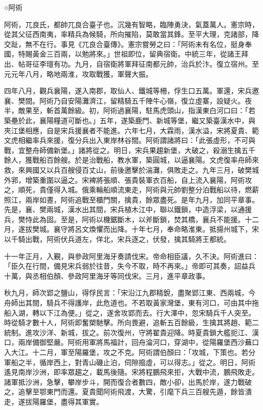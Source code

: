 
\begin{pinyinscope}

 ○阿術



 阿術，兀良氏，都帥兀良合臺子也。沉幾有智略，臨陣勇決，氣蓋萬人。憲宗時，從其父征西南夷，率精兵為候騎，所向摧陷，莫敢當其鋒。至平大理，克諸部，降交趾，無不在行。事見《兀良合臺傳》。憲宗嘗勞之曰：「阿術未有名位，挺身奉國，特賜黃金三百兩，以勉將來。」世祖即位，留典宿衛。中統三年，從諸王拜出、帖哥征李璮有功。九月，自宿衛將軍拜征南都元帥，治兵於汴。復立宿州。至元元年八月，略地兩淮，攻取戰獲，軍聲大振。



 四年八月，觀兵襄陽，遂入南郡，取仙人、鐵城等柵，俘生口五萬。軍還，宋兵邀襄、樊間。阿術乃自安陽灘濟江，留精騎五千陣牛心嶺，復立虛寨，設疑火。夜半，敵果至，斬首萬餘級。初，阿術過襄陽，駐馬虎頭山，指漢東白河口曰：「若築壘於此，襄陽糧道可斷也。」五年，遂築鹿門、新城等堡，繼又築臺漢水中，與夾江堡相應，自是宋兵援襄者不能進。六年七月，大霖雨，漢水溢，宋將夏貴、範文虎相繼率兵來援，復分兵出入東岸林谷間。阿術謂諸將曰：「此張虛形，不可與戰，宜整舟師備新堡。」諸將從之。明日，宋兵果趨新堡，大破之，殺溺生擒五千餘人，獲戰船百餘艘。於是治戰船，教水軍，築圓城，以逼襄陽。文虎復率舟師來救，來興國又以兵百艘侵百丈山，前後邀擊於湍灘，俱敗走之。九年三月，破樊城外郛，增築重圍以逼之。宋裨將張順、張貴裝軍衣百船，自上流入襄陽，阿術攻之，順死，貴僅得入城。俄乘輪船順流東走，阿術與元帥劉整分泊戰船以待，燃薪照江，兩岸如晝，阿術追戰至櫃門關，擒貴，餘眾盡死。是年九月，加同平章事。先是，襄、樊兩城，漢水出其間，宋兵植木江中，聯以鐵鎖，中造浮梁，以通援兵，樊恃此為固。至是，阿術以機鋸斷木，以斧斷鎖，焚其橋，襄兵不能援。十二月，遂拔樊城。襄守將呂文煥懼而出降。十年七月，奉命略淮東。抵揚州城下，宋以千騎出戰，阿術伏兵道左，佯北，宋兵逐之，伏發，擒其騎將王都統。



 十一年正月，入覲，與參政阿里海牙奏請伐宋。帝命相臣議，久不決。阿術進曰：「臣久在行間，備見宋兵弱於往昔，失今不取，時不再來。」帝即可其奏，詔益兵十萬，與丞相伯顏、參政阿里海牙等同伐宋。三月，進平章政事。



 秋九月，師次郢之鹽山，得俘民言：「宋沿江九郡精銳，盡聚郢江東、西兩城，今舟師出其間，騎兵不得護岸，此危道也。不若取黃家灣堡，東有河口，可由其中拖船入湖，轉以下江為便。」從之，遂舍攻郢而去。行大澤中，忽宋騎兵千人突至。時從騎才數十人，阿術即奮槊馳擊。所向畏避，追斬五百餘級，生擒其將趙、範二統制。進攻沙洋、新城，拔之。前次復州，守將翟貴迎降。時夏貴鎖大艦扼江、漢口，兩岸備御堅嚴。阿術用軍將馬福計，回舟淪河口，穿湖中，從陽羅堡西沙蕪口入大江。十二月，軍至陽羅堡，攻之不克。阿術謂伯顏曰：「攻城，下策也。若分軍船之半，循岸西上，對青山磯止泊，伺隙搗虛，可以得志。」從之。明日，阿術遙見南岸沙洲，即率眾趨之，載馬後隨。宋將程鵬飛來拒，大戰中流，鵬飛敗走。諸軍抵沙洲，急擊，攀岸步斗，開而復合者數四，敵小卻，出馬於岸，遂力戰破之，追擊至鄂東門而還。夏貴聞阿術飛渡，大驚，引麾下兵三百艘先遁，餘皆潰走，遂拔陽羅堡，盡得其軍實。




\end{pinyinscope}
